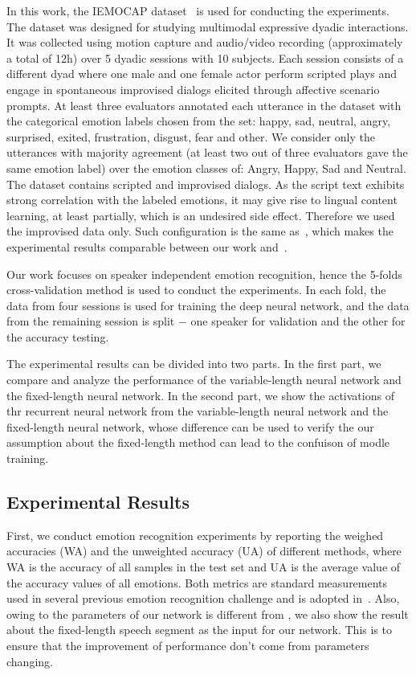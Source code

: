 \documentclass[a4paper]{article}
\begin{document}
In this work, the IEMOCAP dataset~\cite{busso2008} is used for conducting the experiments. The dataset was designed for studying multimodal expressive dyadic interactions. It was collected using motion capture and audio/video recording (approximately a total of 12h) over 5 dyadic sessions with 10 subjects. Each session consists of a different dyad where one male and one female actor perform scripted plays and engage in spontaneous improvised dialogs elicited through affective scenario prompts. At least three evaluators annotated each utterance in the dataset with the categorical emotion labels chosen from the set: happy, sad, neutral, angry, surprised, exited, frustration, disgust, fear and other. We consider only the utterances with majority agreement (at least two out of three evaluators gave the same emotion label) over the emotion classes of: Angry, Happy, Sad and Neutral. The dataset contains scripted and improvised dialogs. As the script text exhibits strong correlation with the labeled emotions, it may give rise to lingual content learning, at least partially, which is an undesired side effect. Therefore we used the improvised data only. Such configuration is the same as~\cite{satt2017}, which makes the experimental results comparable between our work and~\cite{satt2017}.

Our work focuses on speaker independent emotion recognition, hence the 5-folds cross-validation method is used to conduct the experiments. In each fold, the data from four sessions is used for training the deep neural network, and the data from the remaining session is split $-$ one speaker for validation and the other for the accuracy testing.

The experimental results can be divided into two parts. In the first part, we compare and analyze the performance of the variable-length neural network and the fixed-length neural network. In the second part, we show the activations of thr recurrent neural network from the variable-length neural network and the fixed-length neural network, whose difference can be used to verify the our assumption about the fixed-length method can lead to the confuison of modle training. 

\subsection{Experimental Results}
\label{ssec:experimental results}
First, we conduct emotion recognition experiments by reporting the weighed accuracies (WA) and the unweighted accuracy (UA) of different methods, where WA is the accuracy of all samples in the test set and UA is the average value of the accuracy values of all emotions. Both metrics are standard measurements used in several previous emotion recognition challenge and is adopted in~\cite{satt2017}. Also, owing to the parameters of our network is different from \cite{satt2017}, we also show the result about the fixed-length speech segment as the input for our network. This is to ensure that the improvement of performance don't come from parameters changing.
\end{document}
